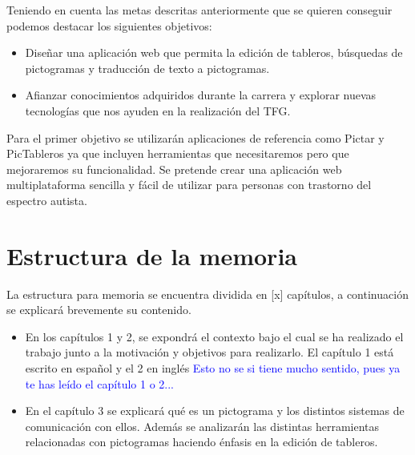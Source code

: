 Teniendo en cuenta las metas descritas anteriormente que se quieren conseguir podemos destacar los siguientes objetivos:
\begin{itemize}
\item Diseñar una aplicación web que permita la edición de tableros, búsquedas de pictogramas y traducción de texto a pictogramas. 

\item Afianzar conocimientos adquiridos durante la carrera y explorar nuevas tecnologías que nos ayuden en la realización del TFG.
\end{itemize}	
Para el primer objetivo se utilizarán aplicaciones de referencia como Pictar y PicTableros ya que incluyen herramientas que necesitaremos pero que mejoraremos su funcionalidad. Se pretende crear una aplicación web multiplataforma sencilla y fácil de utilizar para personas con trastorno del espectro autista. 


\section{Estructura de la memoria}
\label{cap1:sec:Estructura}

La estructura para memoria se encuentra dividida en [x] capítulos, a continuación se explicará brevemente su contenido.
\begin{itemize}
	\item En los capítulos 1 y 2, se expondrá el contexto bajo el cual se ha realizado el trabajo junto a la motivación y objetivos para realizarlo. El capítulo 1 está escrito en español y el 2 en inglés \textcolor{blue}{Esto no se si tiene mucho sentido, pues ya te has leído el capítulo 1 o 2...}
	\item En el capítulo 3 se explicará qué es un pictograma y los distintos sistemas de comunicación con ellos. Además se analizarán las distintas herramientas relacionadas con pictogramas haciendo énfasis en la edición de tableros.
\end{itemize}	




